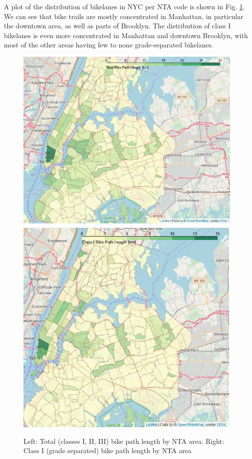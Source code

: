 \documentclass[12pt]{article}
\begin{document}
A plot of the distribution of bikelanes in NYC per NTA code is shown in Fig. \ref{fig:bikelanes}. We can see that bike trails are mostly concentrated in Manhattan, in particular the downtown area, as well as parts of Brooklyn. The distribution of class I bikelanes is even more concentrated in Manhattan and downtown Brooklyn, with most of the other areas having few to none grade-separated bikelanes.
\begin{figure}[htbp]
    \includegraphics[scale=0.42]{all bike path.png}
    \includegraphics[scale=0.42]{class I bike path.PNG}
    \caption{Left: Total (classes I, II, III) bike path length by NTA area. Right: Class I (grade separated) bike path length by NTA area}
    \label{fig:bikelanes}
\end{figure}
\end{document}
